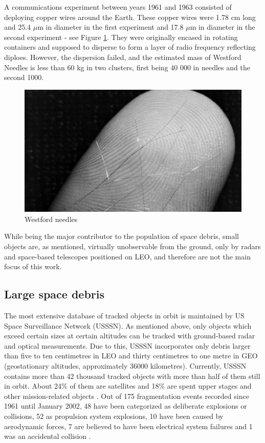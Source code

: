 	A communications experiment between years 1961 and 1963 consisted of deploying copper wires around the Earth. These copper wires were 1.78 cm long and 25.4 $\mu$m in diameter in the first experiment and 17.8 $\mu$m in diameter in the second experiment - see Figure \ref{fig:westfordneedles}. They were originally encased in rotating containers and supposed to disperse to form a layer of radio frequency reflecting diploes. However, the dispersion failed, and the estimated mass of Westford Needles is less than 60 kg in two clusters, first being 40 000 in needles and the second 1000.
	
\begin{figure}[H]
  \includegraphics[width=\linewidth]{images/westfordneedles}
  \caption{Westford needles}
  \label{fig:westfordneedles}
\end{figure}	
	
	
	While being the major contributor to the population of space debris, small objects are, as mentioned, virtually unobservable from the ground, only by radars and space-based telescopes positioned on LEO, and therefore are not the main focus of this work.

\subsection{Large space debris}\label{subsec:large_space_debris}
The most extensive database of tracked objects in orbit is maintained by US Space Surveillance Network (USSSN). As mentioned above, only objects which exceed certain sizes at certain altitudes can be tracked with ground-based radar and optical measurements. Due to this, USSSN incorporates only debris larger than five to ten centimetres in LEO and thirty centimetres to one metre in GEO (geostationary altitudes, approximately 36000 kilometres). Currently, USSSN contains more than 42 thousand tracked objects with more than half of them still in orbit. About 24\% of them are satellites and 18\% are spent upper stages and other mission-related objects \citep{esabr336}. Out of 175 fragmentation events recorded since 1961 until January 2002, 48 have been categorized as deliberate explosions or collisions, 52 as propulsion system explosions, 10 have been caused by aerodynamic forces, 7 are believed to have been electrical system failures and 1 was an accidental collision \citep{klinkrad2006space}. 

